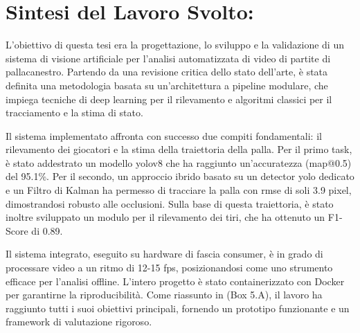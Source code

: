 \documentclass[12pt,a4paper,openright,twoside]{book}
\begin{document}
\section{Sintesi del Lavoro Svolto:}
\label{sec:sintesi-lavoro-svolto}
L'obiettivo di questa tesi era la progettazione, lo sviluppo e la
validazione di un sistema di visione artificiale per l'analisi
automatizzata di video di partite di pallacanestro. Partendo da
una revisione critica dello stato dell'arte, è stata definita una
metodologia basata su un'architettura a pipeline modulare, che
impiega tecniche di deep learning per il rilevamento e algoritmi
classici per il tracciamento e la stima di stato.


Il sistema implementato affronta con successo due compiti
fondamentali: il rilevamento dei giocatori e la stima della
traiettoria della palla. Per il primo task, è stato addestrato un
modello \ac{yolo}v8 che ha raggiunto un'accuratezza (\ac{map}@0.5) del 95.1\%.
Per il secondo, un approccio ibrido basato su un detector \ac{yolo}
dedicato e un Filtro di Kalman ha permesso di tracciare la palla
con \ac{rmse} di soli 3.9 pixel, dimostrandosi robusto alle occlusioni. 
Sulla base di questa traiettoria, è stato inoltre sviluppato un modulo 
per il rilevamento dei tiri, che ha ottenuto un F1-Score di 0.89.


Il sistema integrato, eseguito su hardware di fascia consumer, è in
grado di processare video a un ritmo di 12-15 \ac{fps}, posizionandosi
come uno strumento efficace per l'analisi offline. 
L'intero progetto è stato containerizzato con Docker per garantirne 
la riproducibilità. Come riassunto in (Box 5.A), il lavoro ha
raggiunto tutti i suoi obiettivi principali, fornendo un prototipo
funzionante e un framework di valutazione rigoroso.
\end{document}
